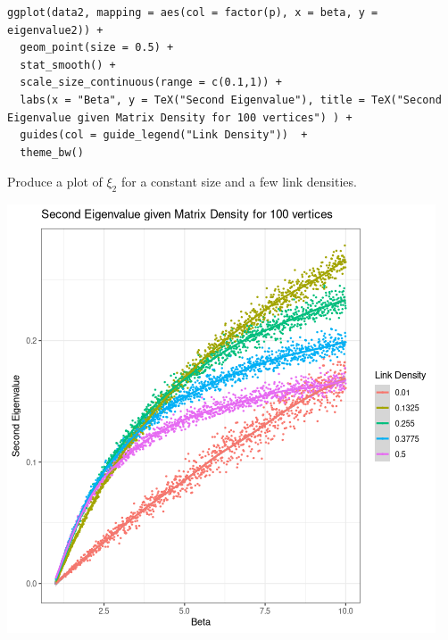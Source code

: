 \documentclass[11pt]{article}
\begin{document}
\begin{listing}[htbp]
\begin{verbatim}
ggplot(data2, mapping = aes(col = factor(p), x = beta, y = eigenvalue2)) +
  geom_point(size = 0.5) +
  stat_smooth() +
  scale_size_continuous(range = c(0.1,1)) +
  labs(x = "Beta", y = TeX("Second Eigenvalue"), title = TeX("Second Eigenvalue given Matrix Density for 100 vertices") ) +
  guides(col = guide_legend("Link Density"))  +
  theme_bw()
\end{verbatim}
\caption{\label{l:fig:er_constant_size}Produce a plot of \(\xi_{2}\) for a constant size and a few link densities.}
\end{listing}

\begin{center}
\includegraphics[width=.9\linewidth]{media/constant_size_erdos_density.png}
\end{center}
\end{document}
